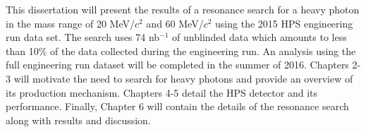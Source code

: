 This dissertation will present the results of a resonance search for a heavy 
photon in the mass range of 20 MeV/$c^2$ and 60 MeV/$c^2$ using the 2015 HPS
engineering run data set.  The search uses 74 nb$^{-1}$ of unblinded data which 
amounts to less than 10\% of the data collected during the engineering run.
An analysis using the full engineering run dataset will be completed in the 
summer of 2016. Chapters 2-3 will motivate the need to search for heavy 
photons and provide an overview of its production mechanism.  Chapters 4-5 
detail the HPS detector and its performance.  Finally, Chapter 6 will contain
the details of the resonance search along with results and discussion.

